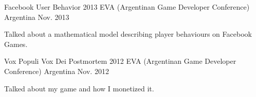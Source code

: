 

\begin{cventries}

  \cventry
    {Facebook User Behavior} %
    {2013 EVA (Argentinan Game Developer Conference)} %
    {Argentina} %
    {Nov. 2013} %
    {
      \begin{cvitems} %
         \item {Talked about a mathematical model describing player behaviours on Facebook Games.}
      \end{cvitems}
    }

 \cventry
    {Vox Populi Vox Dei Postmortem} %
    {2012 EVA (Argentinan Game Developer Conference)} %
    {Argentina} %
    {Nov. 2012} %
    {
      \begin{cvitems} %
        \item {Talked about my game and how I monetized it.}
      \end{cvitems}
    }

\end{cventries}
